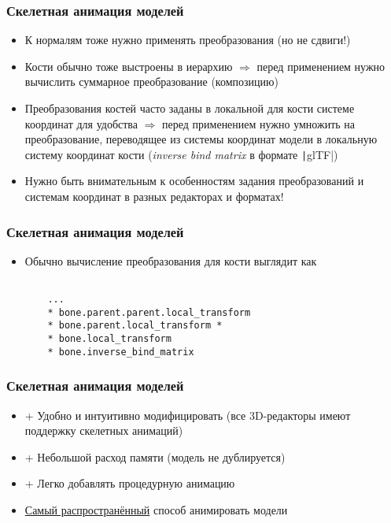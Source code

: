 \documentclass[10pt]{beamer}
\begin{document}
\begin{frame}[fragile]
\frametitle{Скелетная анимация моделей}
\begin{itemize}
\item К нормалям тоже нужно применять преобразования (но не сдвиги!)
\pause
\item Кости обычно тоже выстроены в иерархию \begin{math}\Longrightarrow\end{math} перед применением нужно вычислить суммарное преобразование (композицию)
\pause
\item Преобразования костей часто заданы в локальной для кости системе координат для удобства \begin{math}\Longrightarrow\end{math} перед применением нужно умножить на преобразование, переводящее из системы координат модели в локальную систему координат кости (\textit{inverse bind matrix} в формате \texttt|glTF|)
\pause
\item Нужно быть внимательным к особенностям задания преобразований и системам координат в разных редакторах и форматах!
\end{itemize}
\end{frame}

\begin{frame}[fragile]
\frametitle{Скелетная анимация моделей}
\begin{itemize}
\item Обычно вычисление преобразования для кости выглядит как
\begin{verbatim}

    ...
    * bone.parent.parent.local_transform
    * bone.parent.local_transform *
    * bone.local_transform
    * bone.inverse_bind_matrix
\end{verbatim}
\end{itemize}
\end{frame}

\begin{frame}[fragile]
\frametitle{Скелетная анимация моделей}
\begin{itemize}
\item {\color{green}+} Удобно и интуитивно модифицировать (все 3D-редакторы имеют поддержку скелетных анимаций)
\pause
\item {\color{green}+} Небольшой расход памяти (модель не дублируется)
\pause
\item {\color{green}+} Легко добавлять процедурную анимацию
\pause
\item \underline{Самый распространённый} способ анимировать модели
\end{itemize}
\end{frame}
\end{document}
